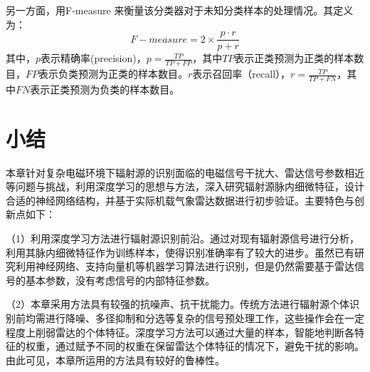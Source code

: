 另一方面，用F-measure 来衡量该分类器对于未知分类样本的处理情况。其定义为：
\begin{equation}
	F-measure=2\times\frac{p\cdot r}{p+r}
\end{equation}
其中，$p$表示精确率(precision)，$p=\frac{TP}{TP+FP}$，其中$TP$表示正类预测为正类的样本数目，$FP$表示负类预测为正类的样本数目。$r$表示召回率（recall），$r=\frac{TP}{TP+FN}$，其中$FN$表示正类预测为负类的样本数目。

\section{小结}
本章针对复杂电磁环境下辐射源的识别面临的电磁信号干扰大、雷达信号参数相近等问题与挑战，利用深度学习的思想与方法，深入研究辐射源脉内细微特征，设计合适的神经网络结构，并基于实际机载气象雷达数据进行初步验证。主要特色与创新点如下：

（1）利用深度学习方法进行辐射源识别前沿。通过对现有辐射源信号进行分析，利用其脉内细微特征作为训练样本，使得识别准确率有了较大的进步。虽然已有研究利用神经网络、支持向量机等机器学习算法进行识别，但是仍然需要基于雷达信号的基本参数，没有考虑信号的内部特征参数。

（2）本章采用方法具有较强的抗噪声、抗干扰能力。传统方法进行辐射源个体识别前均需进行降噪、多径抑制和分选等复杂的信号预处理工作，这些操作会在一定程度上削弱雷达的个体特征。深度学习方法可以通过大量的样本，智能地判断各特征的权重，通过赋予不同的权重在保留雷达个体特征的情况下，避免干扰的影响。由此可见，本章所运用的方法具有较好的鲁棒性。


